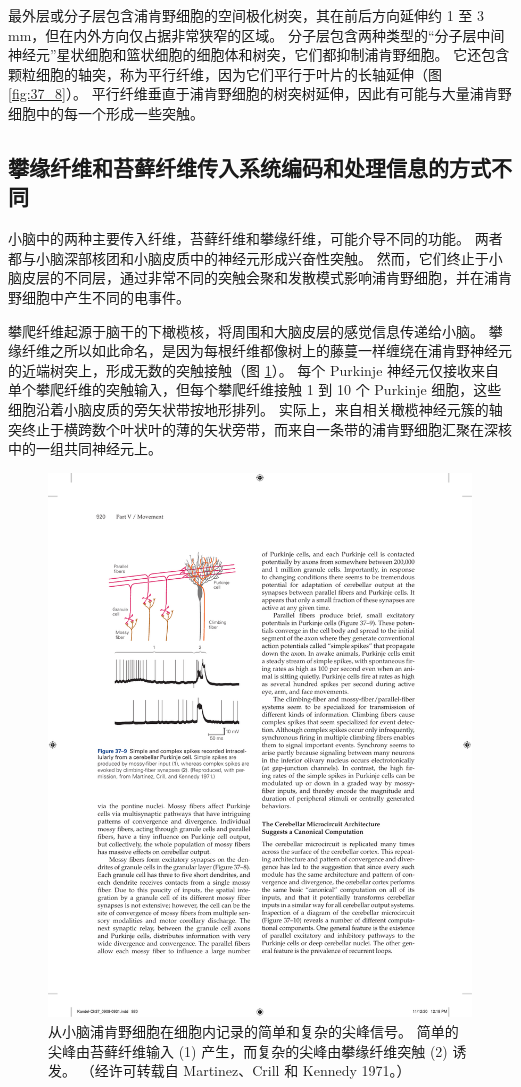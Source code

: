 最外层或分子层包含浦肯野细胞的空间极化树突，其在前后方向延伸约 1 至 3 mm，但在内外方向仅占据非常狭窄的区域。
分子层包含两种类型的“分子层中间神经元”星状细胞和篮状细胞的细胞体和树突，它们都抑制浦肯野细胞。
它还包含颗粒细胞的轴突，称为平行纤维，因为它们平行于叶片的长轴延伸（图 \ref{fig:37_8}）。
平行纤维垂直于浦肯野细胞的树突树延伸，因此有可能与大量浦肯野细胞中的每一个形成一些突触。


\subsection{攀缘纤维和苔藓纤维传入系统编码和处理信息的方式不同}

小脑中的两种主要传入纤维，苔藓纤维和攀缘纤维，可能介导不同的功能。
两者都与小脑深部核团和小脑皮质中的神经元形成兴奋性突触。
然而，它们终止于小脑皮层的不同层，通过非常不同的突触会聚和发散模式影响浦肯野细胞，并在浦肯野细胞中产生不同的电事件。


攀爬纤维起源于脑干的下橄榄核，将周围和大脑皮层的感觉信息传递给小脑。
攀缘纤维之所以如此命名，是因为每根纤维都像树上的藤蔓一样缠绕在浦肯野神经元的近端树突上，形成无数的突触接触（图 \ref{fig:37_9}）。
每个 Purkinje 神经元仅接收来自单个攀爬纤维的突触输入，但每个攀爬纤维接触 1 到 10 个 Purkinje 细胞，这些细胞沿着小脑皮质的旁矢状带按地形排列。
实际上，来自相关橄榄神经元簇的轴突终止于横跨数个叶状叶的薄的矢状旁带，而来自一条带的浦肯野细胞汇聚在深核中的一组共同神经元上。


\begin{figure}[htbp]
	\centering
	\includegraphics[width=0.45\linewidth]{chap37/fig_37_9}
	\caption{从小脑浦肯野细胞在细胞内记录的简单和复杂的尖峰信号。 简单的尖峰由苔藓纤维输入 (1) 产生，而复杂的尖峰由攀缘纤维突触 (2) 诱发。 （经许可转载自 Martinez、Crill 和 Kennedy 1971。）}
	\label{fig:37_9}
\end{figure}


